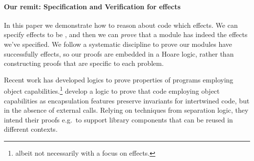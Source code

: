 

\paragraph{Our remit:  Specification and Verification for  \tamed effects}
In this paper we demonstrate how to reason about  code which \tames effects.  %
We can specify effects to be \tamed, 
and then we can \emph{prove} that a module has indeed \tamed the effects we've specified.
We follow a systematic discipline to prove our modules have successfully \tamed effects,
so our proofs are embedded in a Hoare logic, rather than constructing proofs that are specific to each problem.

Recent work has developed logics to prove properties of programs employing object capabilities.\footnote{albeit not necessarily with a focus on \tamed effects.}
\citet{ddd} develop a logic to prove that   code employing object
capabilities as encapsulation features preserve invariants for
intertwined code, but in the absence of external calls. Relying on techniques from separation logic, they intend their proofs
e.g.\ to support library components that can be reused in different
contexts.
 
